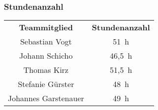 \begin{landscape}
\subsubsection{Stundenanzahl}
\begin{center}
\begin{tabular}{ c c }
    \textbf{Teammitglied} & \textbf{Stundenanzahl}\\
    Sebastian Vogt & 51~h\\
    Johann Schicho & 46,5~h\\
    Thomas Kirz & 51,5~h\\
    Stefanie Gürster & 48~h\\
    Johannes Garstenauer & 49~h
\end{tabular}
\end{center}

\end{landscape}